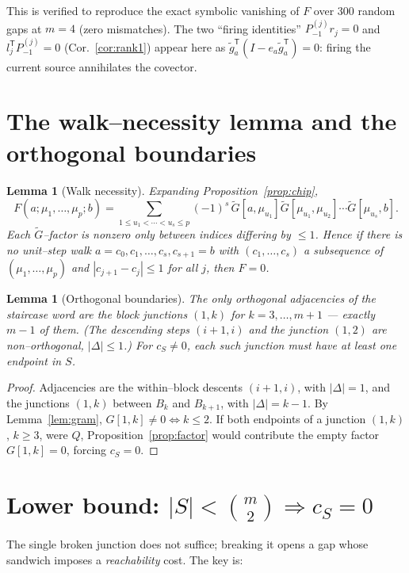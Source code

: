 \documentclass[11pt]{article}
\newtheorem{lemma}[theorem]{Lemma}
\theoremstyle{definition}
\newcommand{\Pm}{P_{-1}}
\newcommand{\Gt}{\widetilde G}
\begin{document}
This is verified to reproduce the exact symbolic vanishing of $F$ over $300$ random
gaps at $m=4$ (zero mismatches). The two ``firing identities''
$\Pm^{(j)}r_j=0$ and $l_j^{\mathsf T}\Pm^{(j)}=0$ (Cor.~\ref{cor:rank1}) appear here as
$\tilde g_a^{\mathsf T}(I-e_a\tilde g_a^{\mathsf T})=0$: firing the current source annihilates
the covector.

\section{The walk--necessity lemma and the orthogonal boundaries}

\begin{lemma}[Walk necessity]\label{lem:walk}
Expanding Proposition~\ref{prop:chip},
\[
F(a;\mu_1,\dots,\mu_p;b)=\sum_{1\le u_1<\cdots<u_s\le p}(-1)^s\,
\Gt[a,\mu_{u_1}]\Gt[\mu_{u_1},\mu_{u_2}]\cdots\Gt[\mu_{u_s},b].
\]
Each $\Gt$--factor is nonzero only between indices differing by $\le1$. Hence if there
is \emph{no} unit--step walk $a=c_0,c_1,\dots,c_s,c_{s+1}=b$ with $(c_1,\dots,c_s)$ a
subsequence of $(\mu_1,\dots,\mu_p)$ and $|c_{j+1}-c_j|\le1$ for all $j$, then
$F=0$.
\end{lemma}

\begin{lemma}[Orthogonal boundaries]\label{lem:bdry}
The only orthogonal adjacencies of the staircase word are the block junctions
$(1,k)$ for $k=3,\dots,m+1$ --- exactly $m-1$ of them. (The descending steps
$(i{+}1,i)$ and the junction $(1,2)$ are non--orthogonal, $|{\Delta}|\le1$.)
For $c_S\ne0$, each such junction must have at least one endpoint in $S$.
\end{lemma}

\begin{proof}
Adjacencies are the within--block descents $(i{+}1,i)$, with $|{\Delta}|=1$, and the
junctions $(1,k)$ between $B_k$ and $B_{k+1}$, with $|{\Delta}|=k-1$. By
Lemma~\ref{lem:gram}, $G[1,k]\ne0\iff k\le2$. If both endpoints of a junction
$(1,k)$, $k\ge3$, were $Q$, Proposition~\ref{prop:factor} would contribute the empty
factor $G[1,k]=0$, forcing $c_S=0$.
\end{proof}

\section{Lower bound: $|S|<\binom m2\Rightarrow c_S=0$}

The single broken junction does not suffice; breaking it opens a gap whose sandwich
imposes a \emph{reachability} cost. The key is:
\end{document}
